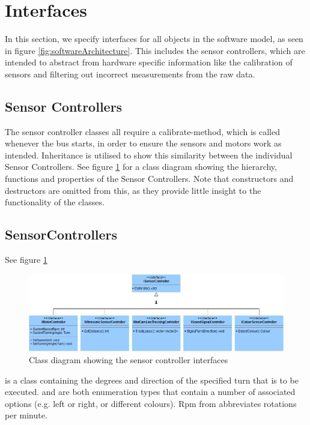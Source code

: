 \section{Interfaces}
In this section, we specify interfaces for all objects in the software model, as seen in figure \ref{fig:softwareArchitecture}. This includes the sensor controllers, which are intended to abstract from hardware specific information like the calibration of sensors and filtering out incorrect measurements from the raw data. 

\subsection{Sensor Controllers}
The sensor controller classes all require a calibrate-method, which is called whenever the bus starts, in order to ensure the sensors and motors work as intended. Inheritance is utilised to show this similarity between the individual Sensor Controllers. See figure \ref{fig:interfaceSensorControllers} for a class diagram showing the hierarchy, functions and properties of the Sensor Controllers. Note that constructors and destructors are omitted from this, as they provide little insight to the functionality of the classes. 

\subsection{SensorControllers}
See figure \ref{fig:interfaceSensorControllers} 

\begin{figure}[ht]
    \includegraphics[width=\textwidth]{Images/Design/InterfaceSensorControllers.png}
    \caption{Class diagram showing the sensor controller interfaces}
    \label{fig:interfaceSensorControllers}
\end{figure}

 is a class containing the degrees and direction of the specified turn that is to be executed.  and  are both enumeration types that contain a number of associated options (e.g. left or right, or different colours). Rpm from  abbreviates rotations per minute.

